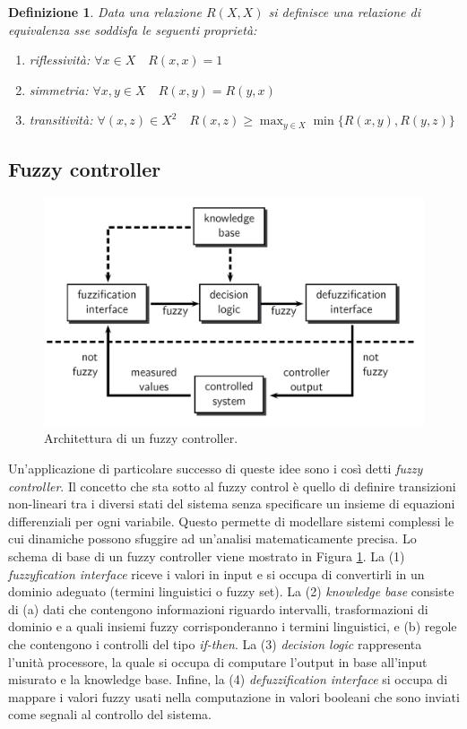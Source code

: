 \documentclass[10pt,a4paper]{article}
\newtheorem{definition}{Definizione}
\begin{document}
\begin{definition}
Data una relazione $R(X,X)$ si definisce una \emph{relazione di equivalenza} sse soddisfa le seguenti proprietà:
\begin{enumerate}
\item{\emph{riflessività}: $\forall x \in X \quad R(x,x) = 1$ }
\item{\emph{simmetria}: $\forall x,y \in X \quad R(x,y) = R(y,x)$ }
\item{\emph{transitività}: $\forall (x,z) \in X^2 \quad R(x,z) \geq \max_{y \in X} \min \{ R(x,y),R(y,z) \}$ }
\end{enumerate}
\end{definition}

\subsection{Fuzzy controller}

\begin{figure}
\centering
\includegraphics[scale=0.3]{img/fuzzycontroller.png}
\caption{Architettura di un fuzzy controller.}
\label{fig:30}
\end{figure}

Un'applicazione di particolare successo di queste idee sono i così detti \emph{fuzzy controller}. Il concetto che sta sotto al fuzzy control è quello di definire transizioni non-lineari tra i diversi stati del sistema senza specificare un insieme di equazioni differenziali per ogni variabile. Questo permette di modellare sistemi complessi le cui dinamiche possono sfuggire ad un'analisi matematicamente precisa. Lo schema di base di un fuzzy controller viene mostrato in Figura \ref{fig:30}. La (1) \emph{fuzzyfication interface} riceve i valori in input e si occupa di convertirli in un dominio adeguato (termini linguistici o fuzzy set). La (2) \emph{knowledge base} consiste di (a) dati che contengono informazioni riguardo intervalli, trasformazioni di dominio e a quali insiemi fuzzy corrisponderanno i termini linguistici, e (b) regole che contengono i controlli del tipo \emph{if-then}. La (3) \emph{decision logic} rappresenta l'unità processore, la quale si occupa di computare l'output in base all'input misurato e la knowledge base. Infine, la (4) \emph{defuzzification interface} si occupa di mappare i valori fuzzy usati nella computazione in valori booleani che sono inviati come segnali al controllo del sistema. 
\end{document}
